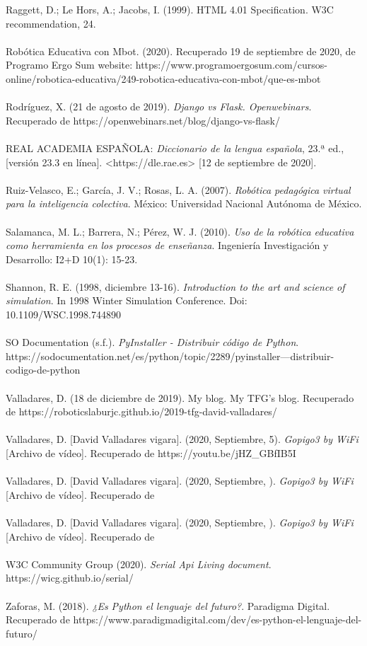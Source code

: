 \documentclass{report}
\begin{document}
Raggett, D.; Le Hors, A.; Jacobs, I. (1999). HTML 4.01 Specification. W3C recommendation, 24.
\\
\\
Robótica Educativa con Mbot. (2020). Recuperado 19 de septiembre de 2020, de Programo Ergo Sum website: https://www.programoergosum.com/cursos-online/robotica-educativa/249-robotica-educativa-con-mbot/que-es-mbot
\\
\\
Rodríguez, X. (21 de agosto de 2019).  \textit{Django vs Flask. Openwebinars}. Recuperado de https://openwebinars.net/blog/django-vs-flask/
\\
\\
REAL ACADEMIA ESPAÑOLA: \textit{Diccionario de la lengua española}, 23.ª ed., [versión 23.3 en línea]. <https://dle.rae.es> [12 de septiembre de 2020].
\\
\\
Ruiz-Velasco, E.; García, J. V.; Rosas, L. A. (2007). \textit{Robótica pedagógica virtual para la inteligencia colectiva}. México: Universidad Nacional Autónoma de México.
\\
\\
Salamanca, M. L.; Barrera, N.; Pérez, W. J. (2010). \textit{Uso de la robótica educativa como herramienta en los procesos de enseñanza}. Ingeniería Investigación y Desarrollo: I2+D 10(1): 15-23.
\\
\\
Shannon, R. E. (1998, diciembre 13-16). \textit{Introduction to the art and science of simulation}. In 1998 Winter Simulation Conference. Doi: 10.1109/WSC.1998.744890
\\
\\
SO Documentation (s.f.).  \textit{PyInstaller - Distribuir código de Python}.  https://sodocumentation.net/es/python/topic/2289/pyinstaller---distribuir-codigo-de-python
\\
\\
Valladares, D. (18 de diciembre de 2019). My blog. My TFG’s blog. Recuperado de https://roboticslaburjc.github.io/2019-tfg-david-valladares/
\\
\\
Valladares, D. [David Valladares vigara]. (2020, Septiembre, 5). \textit{Gopigo3 by WiFi} [Archivo de vídeo]. Recuperado de https://youtu.be/jHZ\_GBfIB5I
\\
\\
Valladares, D. [David Valladares vigara]. (2020, Septiembre, ). \textit{Gopigo3 by WiFi} [Archivo de vídeo]. Recuperado de
\\
\\
Valladares, D. [David Valladares vigara]. (2020, Septiembre, ). \textit{Gopigo3 by WiFi} [Archivo de vídeo]. Recuperado de
\\
\\
W3C Community Group (2020). \textit{Serial Api Living document}. https://wicg.github.io/serial/
\\
\\
Zaforas, M. (2018). \textit{¿Es Python el lenguaje del futuro?}. Paradigma Digital. Recuperado de https://www.paradigmadigital.com/dev/es-python-el-lenguaje-del-futuro/
\end{document}
